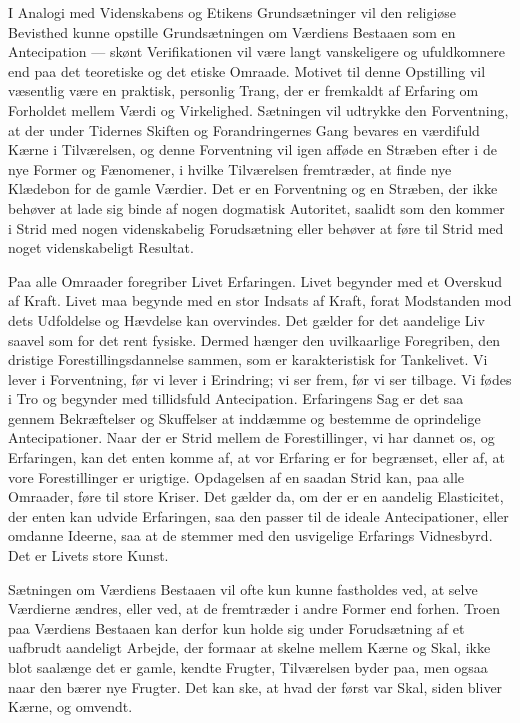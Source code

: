 \documentclass[12pt,a4paper,openany]{book}
\newcommand{\opage}[1]{\marginnote{\footnotesize\textit{[#1]}}}
\begin{document}
I Analogi med Videnskabens og Etikens Grundsætninger vil den religiøse
Bevisthed kunne opstille Grundsætningen om Værdiens Bestaaen som en
Antecipation --- skønt Verifikationen vil være langt vanskeligere og
ufuldkomnere end paa det teoretiske og det etiske Omraade. Motivet til
denne Opstilling vil væsentlig være en praktisk, personlig Trang, der er
fremkaldt af Erfaring om Forholdet mellem Værdi og Virkelighed.
Sætningen vil udtrykke den Forventning, at der under Tidernes Skiften og
Forandringernes Gang bevares en værdifuld Kærne i Tilværelsen, og denne
Forventning vil igen afføde en Stræben efter i de nye Former og
Fænomener, i hvilke Tilværelsen fremtræder, at finde nye Klædebon for de
gamle Værdier. Det er en Forventning og en Stræben, der ikke behøver at
lade sig binde af nogen dogmatisk Autoritet, saalidt som den kommer i
Strid med nogen videnskabelig Forudsætning eller behøver at føre til
Strid med noget videnskabeligt Resultat.

Paa alle Omraader foregriber Livet Erfaringen. Livet begynder med et
Overskud af Kraft. Livet maa begynde med en stor Indsats af Kraft, forat
Modstanden mod dets Udfoldelse og Hævdelse kan overvindes. Det gælder
for det aandelige Liv saavel som for det rent fysiske. Dermed hænger den
uvilkaarlige Foregriben, den dristige Forestillingsdannelse sammen, som
er
\opage{169}karakteristisk for Tankelivet. Vi lever i Forventning, før vi
lever i Erindring; vi ser frem, før vi ser tilbage. Vi fødes i Tro og
begynder med tillidsfuld Antecipation. Erfaringens Sag er det saa gennem
Bekræftelser og Skuffelser at inddæmme og bestemme de oprindelige
Antecipationer. Naar der er Strid mellem de Forestillinger, vi har
dannet os, og Erfaringen, kan det enten komme af, at vor Erfaring er for
begrænset, eller af, at vore Forestillinger er urigtige. Opdagelsen af
en saadan Strid kan, paa alle Omraader, føre til store Kriser. Det
gælder da, om der er en aandelig Elasticitet, der enten kan udvide
Erfaringen, saa den passer til de ideale Antecipationer, eller omdanne
Ideerne, saa at de stemmer med den usvigelige Erfarings Vidnesbyrd. Det
er Livets store Kunst.

Sætningen om Værdiens Bestaaen vil ofte kun kunne fastholdes ved, at
selve Værdierne ændres, eller ved, at de fremtræder i andre Former end
forhen. Troen paa Værdiens Bestaaen kan derfor kun holde sig under
Forudsætning af et uafbrudt aandeligt Arbejde, der formaar at skelne
mellem Kærne og Skal, ikke blot saalænge det er gamle, kendte Frugter,
Tilværelsen byder paa, men ogsaa naar den bærer nye Frugter. Det kan
ske, at hvad der først var Skal, siden bliver Kærne, og omvendt.
\end{document}
